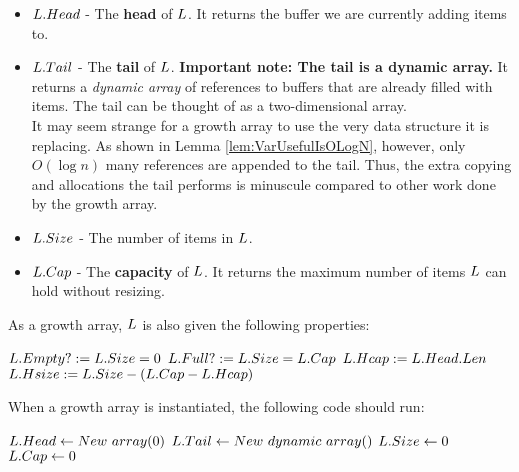 \begin{itemize}
	\item $L.Head$ - The \textbf{head} of $\VarList$. It returns the buffer we are currently adding items to.
	\item $L.Tail$ - The \textbf{tail} of $\VarList$. \textbf{Important note: The tail is a dynamic array.} It returns a \textit{dynamic array} of references to buffers that are already filled with items. The tail can be thought of as a two-dimensional array.\\
	{\HdrNote} It may seem strange for a growth array to use the very data structure it is replacing. As shown in Lemma \ref{lem:VarUsefulIsOLogN}, however, only $O(\log n)$ many references are appended to the tail. Thus, the extra copying and allocations the tail performs is minuscule compared to other work done by the growth array.
	\item $L.Size$ - The number of items in $\VarList$.
	\item $L.Cap$ - The \textbf{capacity} of $\VarList$. It returns the maximum number of items $\VarList$ can hold without resizing.
\end{itemize}

As a growth array, $\VarList$ is also given the following properties:

\begin{algorithm}
	\begin{algorithmic}
		\State $L.Empty? := L.Size = 0$
		\State
		\State $L.Full? := L.Size = L.Cap$
		\State
		\State $L.Hcap := L.Head.Len$
		\State
		\State $L.Hsize := L.Size - \left(L.Cap - L.Hcap\right)$
	\end{algorithmic}
\end{algorithm}

When a growth array is instantiated, the following code should run:

\begin{algorithm}
	\begin{algorithmic}
		\Procedure{$\FuncConstructor$}{$\VarList$}
			\State $L.Head \gets New\ array(0)$
			\State $L.Tail \gets New\ dynamic\ array()$
			\State $L.Size \gets 0$
			\State $L.Cap \gets 0$
		\EndProcedure
	\end{algorithmic}
\end{algorithm}